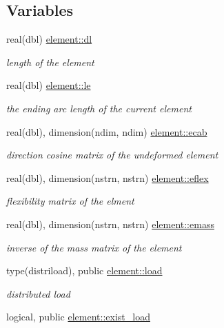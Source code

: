 \subsection*{Variables}
\begin{DoxyCompactItemize}
\item 
real(dbl) \hyperlink{namespaceelement_a2ba7b882a33de416921d1a35d3a5e23a}{element\+::dl}
\begin{DoxyCompactList}\small\item\em length of the element \end{DoxyCompactList}\item 
real(dbl) \hyperlink{namespaceelement_a10e7976ce4185b147c590f281b7691b1}{element\+::le}
\begin{DoxyCompactList}\small\item\em the ending arc length of the current element \end{DoxyCompactList}\item 
real(dbl), dimension(ndim, ndim) \hyperlink{namespaceelement_a235dfda3fd31cfbf932e5a7cba3d18ec}{element\+::ecab}
\begin{DoxyCompactList}\small\item\em direction cosine matrix of the undeformed element \end{DoxyCompactList}\item 
real(dbl), dimension(nstrn, nstrn) \hyperlink{namespaceelement_a5cd41224c84f496a89d157c781b0d207}{element\+::eflex}
\begin{DoxyCompactList}\small\item\em flexibility matrix of the elment \end{DoxyCompactList}\item 
real(dbl), dimension(nstrn, nstrn) \hyperlink{namespaceelement_acd7a12a677d8157d3f792f2090fd0664}{element\+::emass}
\begin{DoxyCompactList}\small\item\em inverse of the mass matrix of the element \end{DoxyCompactList}\item 
type(distriload), public \hyperlink{namespaceelement_a99d2f733169debb6f9d7d8b30fbc49c4}{element\+::load}
\begin{DoxyCompactList}\small\item\em distributed load \end{DoxyCompactList}\item 
logical, public \hyperlink{namespaceelement_a4fecf0570d257bca42bf4ece885f4721}{element\+::exist\+\_\+load}
\item 

\end{DoxyCompactItemize}

